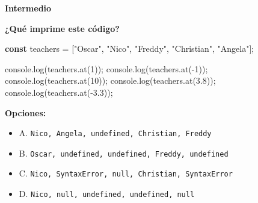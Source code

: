 \documentclass[
  letterpaper,
  DIV=11,
  numbers=noendperiod]{scrreprt}
\newenvironment{Shaded}{\begin{snugshade}}{\end{snugshade}}
\newcommand{\BuiltInTok}[1]{\textcolor[rgb]{0.00,0.23,0.31}{#1}}
\newcommand{\DecValTok}[1]{\textcolor[rgb]{0.68,0.00,0.00}{#1}}
\newcommand{\FloatTok}[1]{\textcolor[rgb]{0.68,0.00,0.00}{#1}}
\newcommand{\FunctionTok}[1]{\textcolor[rgb]{0.28,0.35,0.67}{#1}}
\newcommand{\KeywordTok}[1]{\textcolor[rgb]{0.00,0.23,0.31}{\textbf{#1}}}
\newcommand{\NormalTok}[1]{\textcolor[rgb]{0.00,0.23,0.31}{#1}}
\newcommand{\OperatorTok}[1]{\textcolor[rgb]{0.37,0.37,0.37}{#1}}
\newcommand{\StringTok}[1]{\textcolor[rgb]{0.13,0.47,0.30}{#1}}
\providecommand{\tightlist}{%
  \setlength{\itemsep}{0pt}\setlength{\parskip}{0pt}}
\begin{document}
\begin{tcolorbox}[enhanced jigsaw, left=2mm, toprule=.15mm, leftrule=.75mm, breakable, colback=white, coltitle=black, bottomtitle=1mm, arc=.35mm, rightrule=.15mm, colframe=quarto-callout-caution-color-frame, opacitybacktitle=0.6, toptitle=1mm, opacityback=0, titlerule=0mm, title=\textcolor{quarto-callout-caution-color}{\faFire}\hspace{0.5em}{Dificultad}, bottomrule=.15mm, colbacktitle=quarto-callout-caution-color!10!white]

\textbf{Intermedio}

\end{tcolorbox}

\textbf{¿Qué imprime este código?}

\begin{Shaded}
\begin{Highlighting}[]
\KeywordTok{const}\NormalTok{ teachers }\OperatorTok{=}\NormalTok{ [}\StringTok{"Oscar"}\OperatorTok{,} \StringTok{"Nico"}\OperatorTok{,} \StringTok{"Freddy"}\OperatorTok{,} \StringTok{"Christian"}\OperatorTok{,} \StringTok{"Angela"}\NormalTok{]}\OperatorTok{;}

\BuiltInTok{console}\OperatorTok{.}\FunctionTok{log}\NormalTok{(teachers}\OperatorTok{.}\FunctionTok{at}\NormalTok{(}\DecValTok{1}\NormalTok{))}\OperatorTok{;}
\BuiltInTok{console}\OperatorTok{.}\FunctionTok{log}\NormalTok{(teachers}\OperatorTok{.}\FunctionTok{at}\NormalTok{(}\OperatorTok{{-}}\DecValTok{1}\NormalTok{))}\OperatorTok{;}
\BuiltInTok{console}\OperatorTok{.}\FunctionTok{log}\NormalTok{(teachers}\OperatorTok{.}\FunctionTok{at}\NormalTok{(}\DecValTok{10}\NormalTok{))}\OperatorTok{;}
\BuiltInTok{console}\OperatorTok{.}\FunctionTok{log}\NormalTok{(teachers}\OperatorTok{.}\FunctionTok{at}\NormalTok{(}\FloatTok{3.8}\NormalTok{))}\OperatorTok{;}
\BuiltInTok{console}\OperatorTok{.}\FunctionTok{log}\NormalTok{(teachers}\OperatorTok{.}\FunctionTok{at}\NormalTok{(}\OperatorTok{{-}}\FloatTok{3.3}\NormalTok{))}\OperatorTok{;}
\end{Highlighting}
\end{Shaded}

\textbf{Opciones:}

\begin{itemize}
\tightlist
\item
  A. \texttt{Nico,\ Angela,\ undefined,\ Christian,\ Freddy}
\item
  B. \texttt{Oscar,\ undefined,\ undefined,\ Freddy,\ undefined}
\item
  C. \texttt{Nico,\ SyntaxError,\ null,\ Christian,\ SyntaxError}
\item
  D. \texttt{Nico,\ null,\ undefined,\ undefined,\ null}
\end{itemize}
\end{document}
